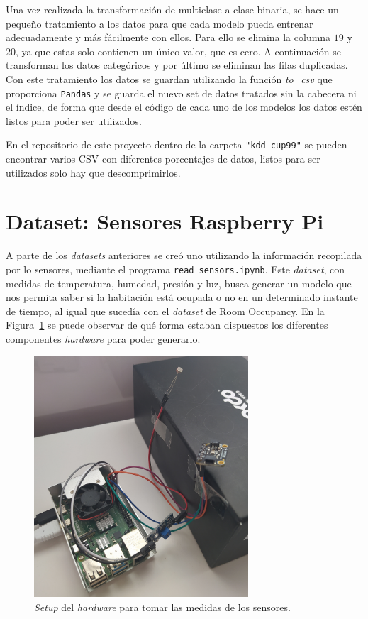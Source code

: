 \documentclass[a4paper, 12pt]{book}
\begin{document}
Una vez realizada la transformación de multiclase a clase binaria, se hace un pequeño tratamiento a los datos para que cada modelo pueda entrenar adecuadamente y más fácilmente con ellos\cite{dataSetTreatment}. Para ello se elimina la columna $19$ y $20$, ya que estas solo contienen un único valor, que es cero. A continuación se transforman los datos categóricos y por último se eliminan las filas duplicadas. Con este tratamiento los datos se guardan utilizando la función \textit{to\_csv} que proporciona \texttt{Pandas} y se guarda el nuevo set de datos tratados sin la cabecera ni el índice, de forma que desde el código de cada uno de los modelos los datos estén listos para poder ser utilizados.

En el repositorio de este proyecto dentro de la carpeta \texttt{"kdd\_cup99"} se pueden encontrar varios CSV con diferentes porcentajes de datos, listos para ser utilizados solo hay que descomprimirlos.

\section{Dataset: Sensores Raspberry Pi}
\label{sec:mi_dataSet}

A parte de los \textit{datasets} anteriores se creó uno utilizando la información recopilada por lo sensores, mediante el programa \texttt{read\_sensors.ipynb}. Este \textit{dataset}, con medidas de temperatura, humedad, presión y luz, busca generar un modelo que nos permita saber si la habitación está ocupada o no en un determinado instante de tiempo, al igual que sucedía con el \textit{dataset} de Room Occupancy. En la Figura~\ref{fig:mi_setup} se puede observar de qué forma estaban dispuestos los diferentes componentes \textit{hardware} para poder generarlo.

\begin{figure}[htb]
  \centering
  \includegraphics[width=8cm, keepaspectratio]{img/mi_setup.jpg}
  \caption{\textit{Setup} del \textit{hardware} para tomar las medidas de los sensores.}\label{fig:mi_setup}
\end{figure}
\end{document}

